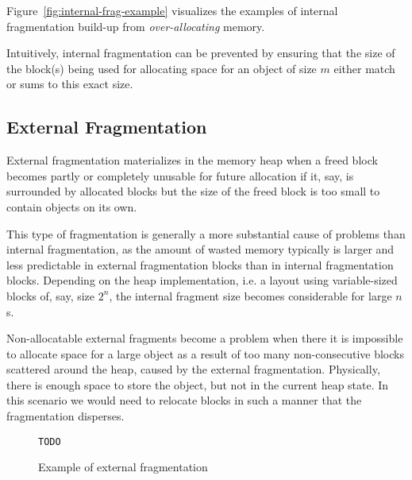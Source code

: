   

Figure~\ref{fig:internal-frag-example} visualizes the examples of internal fragmentation build-up from \textit{over-allocating} memory. 

Intuitively, internal fragmentation can be prevented by ensuring that the size of the block(s) being used for allocating space for an object of size $m$ either match or sums to this exact size.

\subsection{External Fragmentation}
External fragmentation materializes in the memory heap when a freed block becomes partly or completely unusable for future allocation if it, say, is surrounded by allocated blocks but the size of the freed block is too small to contain objects on its own.

This type of fragmentation is generally a more substantial cause of problems than internal fragmentation, as the amount of wasted memory typically is larger and less predictable in external fragmentation blocks than in internal fragmentation blocks. Depending on the heap implementation, i.e. a layout using variable-sized blocks of, say, size $2^n$, the internal fragment size becomes considerable for large $n$s. 

Non-allocatable external fragments become a problem when there it is impossible to allocate space for a large object as a result of too many non-consecutive blocks scattered around the heap, caused by the external fragmentation. Physically, there is enough space to store the object, but not in the current heap state. In this scenario we would need to relocate blocks in such a manner that the fragmentation disperses.

\begin{figure}[ht]
\centering
\texttt{TODO}
\caption{Example of external fragmentation}
\label{fig:external-frag-example}
\end{figure}


